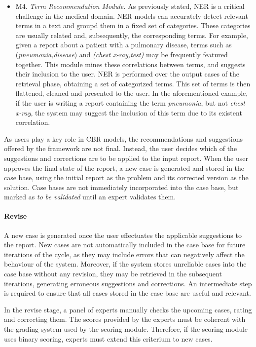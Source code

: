 \begin{itemize}
    \item M4. \textit{Term Recommendation Module.} As previously stated, NER is a critical challenge in the medical domain. NER models can accurately detect relevant terms in a text and groupd them in a fixed set of categories. These categories are usually related and, subsequently, the corresponding terms. For example, given a report about a patient with a pulmonary disease, terms such as (\textit{pneumonia,disease}) and \textit{(chest x-ray,test)} may be frequently featured together. This module mines these correlations between terms, and suggests their inclusion to the user. NER is performed over the output cases of the retrieval phase, obtaining a set of categorized terms. This set of terms is then flattened, cleaned and presented to the user. In the aforementioned example, if the user is writing a report containing the term \textit{pneumonia}, but not \textit{chest x-ray}, the system may suggest the inclusion of this term due to its existent correlation.

\end{itemize}

As users play a key role in CBR models, the recommendations and suggestions offered by the framework are not final. Instead, the user decides which of the suggestions and corrections are to be applied to the input report. When the user approves the final state of the report, a new case is generated and stored in the case base, using the initial report as the problem and its corrected version as the solution. Case bases are not immediately incorporated into the case base, but marked as \textit{to be validated} until an expert validates them.

\paragraph{Revise}\label{5_sec:dl_powered_cbr_revise}
A new case is generated once the user effectuates the applicable suggestions to the report. New cases are not automatically included in the case base for future iterations of the cycle, as they may include errors that can negatively affect the behaviour of the system. Moreover, if the system stores unreliable cases into the case base without any revision, they may be retrieved in the subsequent iterations, generating erroneous suggestions and corrections. An intermediate step is required to ensure that all cases stored in the case base are useful and relevant. 

In the revise stage, a panel of experts manually checks the upcoming cases, rating and correcting them. The scores provided by the experts must be coherent with the grading system used by the scoring module. Therefore, if the scoring module uses binary scoring, experts must extend this criterium to new cases.


